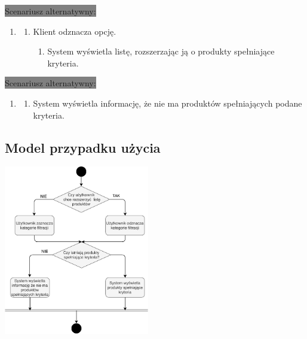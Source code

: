 \documentclass[10pt]{report}
\begin{document}
			\colorbox{grey}{Scenariusz alternatywny:}
			\begin{enumerate}\addtocounter{enumi}{1}
				\item[]
				\begin{enumerate}
					\item Klient odznacza opcję.
					\begin{enumerate}
						\item System wyświetla listę, rozszerzając ją o produkty spełniające kryteria.
					\end{enumerate}
				\end{enumerate}
			\end{enumerate}

	
			\colorbox{grey}{Scenariusz alternatywny:}
			\begin{enumerate}\addtocounter{enumi}{2}
				\item[]
				\begin{enumerate}
					\item System wyświetla informację, że nie ma produktów spełniających podane kryteria.
				\end{enumerate}
			\end{enumerate}

		\subsection{Model przypadku użycia}
			\begin{center}
				\includegraphics[width=180pt]{filtracja.pdf}
			\end{center}
		 
\end{document}
